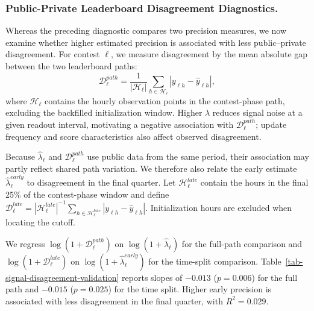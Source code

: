 \documentclass[mnsc]{informs3}
\begin{document}
\subsubsection{Public-Private Leaderboard Disagreement Diagnostics.}
{Whereas the preceding diagnostic compares two precision measures, we now examine whether higher estimated precision is associated with less public--private disagreement. For contest $\ell$, we measure disagreement by the mean absolute gap between the two leaderboard paths:}
\[
\mathcal D_\ell^{path}
=
\frac{1}{|\mathcal H_\ell|}
\sum_{h\in\mathcal H_\ell}
\left|y_{\ell h}-\hat y_{\ell h}\right|,
\]
{where $\mathcal H_\ell$ contains the hourly observation points in the contest-phase path, excluding the backfilled initialization window. Higher $\lambda$ reduces signal noise at a given readout interval, motivating a negative association with $\mathcal D_\ell^{path}$; update frequency and score characteristics also affect observed disagreement.}

{Because $\hat\lambda_\ell$ and $\mathcal D_\ell^{path}$ use public data from the same period, their association may partly reflect shared path variation. We therefore also relate the early estimate $\hat\lambda_\ell^{early}$ to disagreement in the final quarter. Let $\mathcal H_\ell^{late}$ contain the hours in the final 25\% of the contest-phase window and define $\mathcal D_\ell^{late}=|\mathcal H_\ell^{late}|^{-1}\sum_{h\in\mathcal H_\ell^{late}}|y_{\ell h}-\hat y_{\ell h}|$. Initialization hours are excluded when locating the cutoff.}

{We regress $\log(1+\mathcal D_\ell^{path})$ on $\log(1+\hat\lambda_\ell)$ for the full-path comparison and $\log(1+\mathcal D_\ell^{late})$ on $\log(1+\hat\lambda_\ell^{early})$ for the time-split comparison.}
Table~\ref{tab-signal-disagreement-validation} reports slopes of $-0.013$ ($p=0.006$) for the full path and $-0.015$ ($p=0.025$) for the time split. Higher early precision is associated with less disagreement in the final quarter, with $R^2=0.029$.
\end{document}
